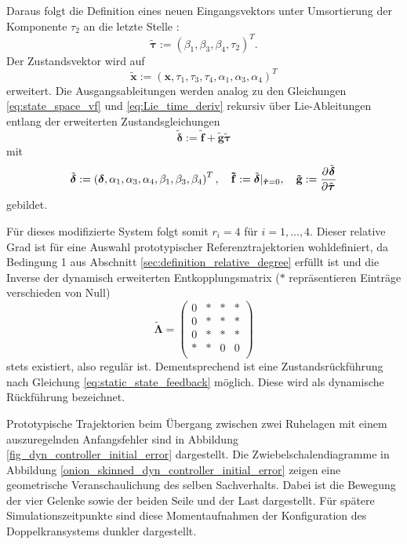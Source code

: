 Daraus folgt die Definition eines neuen Eingangsvektors unter Umsortierung der Komponente $\tau_2$ an die letzte Stelle \cite[S. 201]{NLRT_Roebenack}:
\begin{equation}
	\tilde{\boldsymbol{\tau}} := (\beta_1, \beta_3, \beta_4, \tau_2)^T.
\end{equation}
Der Zustandsvektor wird auf
\begin{equation}
	\tilde{\mathbf{x}} := (\mathbf{x}, \tau_1, \tau_3, \tau_4, \alpha_1, \alpha_3, \alpha_4)^T
\end{equation}
erweitert. Die Ausgangsableitungen werden analog zu den Gleichungen \eqref{eq:state_space_vf} und \eqref{eq:Lie_time_deriv} rekursiv über Lie-Ableitungen entlang der erweiterten Zustandsgleichungen 
\begin{equation}
	\tilde{\boldsymbol{\delta}} := \mathbf{\tilde{f}} + \mathbf{\tilde{g}} \tilde{\boldsymbol{\tau}}
\end{equation}
mit
\begin{align}
	\tilde{\boldsymbol{\delta}} :=
	\left(\boldsymbol{\delta},
		\alpha_1,
		\alpha_3,
		\alpha_4,
		\beta_1,
		\beta_3,
		\beta_4 \right)^T, \quad
	\mathbf{\tilde{f}} := \tilde{\boldsymbol{\delta}}|_{\tilde{\boldsymbol{\tau}} = 0}, \quad
	\mathbf{\tilde{g}} := \frac{\partial^{}\tilde{\boldsymbol{\delta}}}{\partial{\tilde{\boldsymbol{\tau}}}^{}}
\end{align}
gebildet.

Für dieses modifizierte System folgt somit $r_i = 4$ für $i = 1, ..., 4$. Dieser relative Grad ist für eine Auswahl prototypischer Referenztrajektorien wohldefiniert, da Bedingung 1 aus Abschnitt \ref{sec:definition_relative_degree} erfüllt ist und die Inverse der dynamisch erweiterten Entkopplungsmatrix ($*$ repräsentieren Einträge verschieden von Null)
\begin{equation}
	\tilde{\boldsymbol{\Lambda}} =
	\left(\begin{matrix}
		0 & * & * & * \\
		0 & * & * & * \\
		0 & * & * & * \\
		* & * & 0 & 0 \\
	\end{matrix}\right)
\end{equation}
stets existiert, also regulär ist. Dementsprechend ist eine Zustandsrückführung nach Gleichung \eqref{eq:static_state_feedback} möglich. Diese wird als dynamische Rückführung bezeichnet. 

Prototypische Trajektorien beim Übergang zwischen zwei Ruhelagen mit einem auszuregelnden Anfangsfehler sind in Abbildung \ref{fig_dyn_controller_initial_error} dargestellt. Die Zwiebelschalendiagramme in Abbildung \ref{onion_skinned_dyn_controller_initial_error} zeigen eine geometrische Veranschaulichung des selben Sachverhalts. Dabei ist die Bewegung der vier Gelenke sowie der beiden Seile und der Last dargestellt. Für spätere Simulationszeitpunkte sind diese Momentaufnahmen der Konfiguration des Doppelkransystems dunkler dargestellt.

